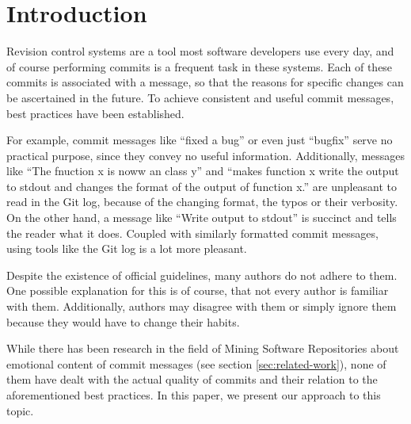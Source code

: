 \section{Introduction}
\label{sec:introduction}

%
%
%
%
%
%

Revision control systems are a tool most software developers use every day, and of course performing commits is a frequent task in these systems. Each of these commits is associated with a message, so that the reasons for specific changes can be ascertained in the future\cite{CB}. To achieve consistent and useful commit messages, best practices have been established\cite{OffGuide,CB,TP,SR}.

For example, commit messages like ``fixed a bug'' or even just ``bugfix'' serve no practical purpose, since they convey no useful information. Additionally, messages like ``The fnuction x is noww an class y'' and ``makes function x write the output to stdout and changes the format of the output of function x.'' are unpleasant to read in the Git log, because of the changing format, the typos or their verbosity. On the other hand, a message like ``Write output to stdout'' is succinct and tells the reader what it does. Coupled with similarly formatted commit messages, using tools like the Git log is a lot more pleasant.

Despite the existence of official guidelines, many authors do not adhere to them. One possible explanation for this is of course, that not every author is familiar with them. Additionally, authors may disagree with them or simply ignore them because they would have to change their habits.

While there has been research in the field of Mining Software Repositories about emotional content of commit messages (see section \ref{sec:related-work}), none of them have dealt with the actual quality of commits and their relation to the aforementioned best practices. In this paper, we present our approach to this topic.

